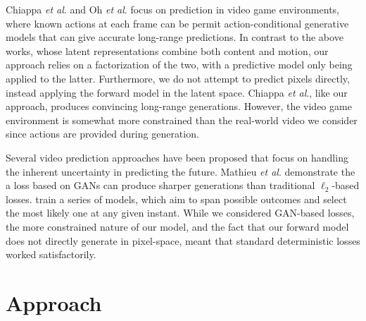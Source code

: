 \documentclass{article}
\newcommand{\etal}{\textit{et al}.\:}
\begin{document}
Chiappa \etal\cite{Chiappa17} and Oh \etal\cite{oh15} focus on prediction in video game
environments, where known actions at each frame can be permit  action-conditional generative models that can give accurate
long-range predictions. In contrast to the above works, whose latent
representations combine both content and motion, our approach relies
on a factorization of the two, with a predictive model only being
applied to the latter. Furthermore, we do not attempt to predict pixels
directly, instead applying the forward model in the latent
space.  Chiappa \etal\cite{Chiappa17}, like our approach, produces
convincing long-range generations. However, the video game environment
is somewhat more constrained than the real-world video we consider since actions are provided during generation.

Several video prediction approaches have been proposed that focus on
handling the inherent uncertainty in predicting the future. Mathieu
\etal\cite{mathieu2016} demonstrate the a loss based on GANs can produce sharper generations than traditional
$\ell_2$-based losses. \cite{Vondrick16} train a series of models,
which aim to span possible outcomes and select the most likely one at
any given instant. While we considered GAN-based losses, the more
constrained nature of our model, and the fact that our forward model does not directly
generate in pixel-space, meant that standard deterministic losses
worked satisfactorily. 

\vspace{-3mm}\section{Approach}\vspace{-3mm}%
\end{document}
